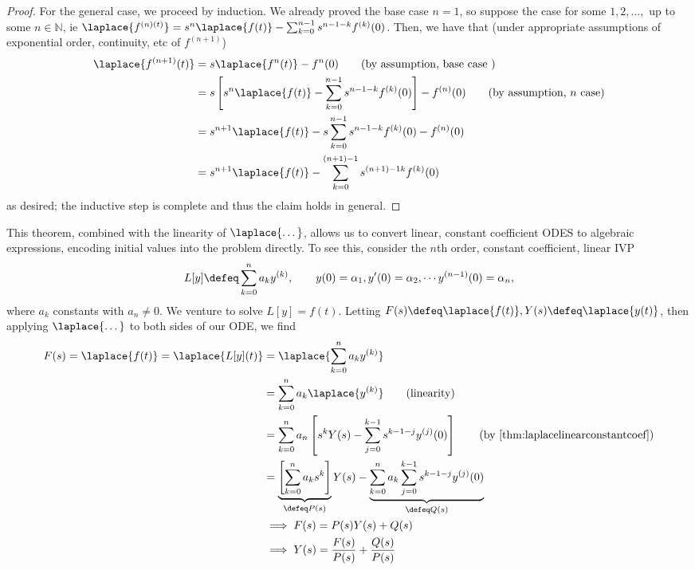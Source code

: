 \begin{proof}
    For the general case, we proceed by induction. We already proved the base case $n = 1$, so suppose the case for some $1, 2, \dots, $ up to some $n \in \mathbb{N}$, ie $\laplace{f^{(n)(t)}} = s^{n} \laplace{f(t)} - \sum_{k=0}^{n-1}s^{n-1-k}f^{(k)}(0)$. Then, we have that (under appropriate assumptions of exponential order, continuity, etc of $f^{(n+1)}$) \begin{align*}
        \laplace{f^{(n+1)}(t)} &= s \laplace{f^{n}(t)} - f^{n}(0) \qquad \text{(by assumption, base case )}\\
        &= s \left[s^n\laplace{f(t)} - \sum_{k=0}^{n-1} s^{n-1-k}f^{(k)}(0)\right] - f^{(n)}(0) \qquad \text{(by assumption, $n$ case)}\\
        &= s^{n+1} \laplace{f(t)} - s \sum_{k=0}^{n-1} s^{n-1 - k} f^{(k)}(0) - f^{(n)}(0)\\
        &= s^{n+1} \laplace{f(t)} - \sum_{k=0}^{(n+1)-1} s^{(n+1)-1  k} f^{(k)}(0)
    \end{align*}
    as desired; the inductive step is complete and thus the claim holds in general.
\end{proof}

This theorem, combined with the linearity of $\laplace{\dots}$, allows us to convert linear, constant coefficient ODES to algebraic expressions, encoding initial values into the problem directly. To see this, consider the $n$th order, constant coefficient, linear IVP \[
L[y] \defeq \sum_{k=0}^n a_ky^{(k)}, \qquad y(0) = \alpha_1, y'(0) = \alpha_2, \cdots y^{(n-1)}(0) = \alpha_n,
\]
where $a_k$ constants with $a_n \neq 0$. We venture to solve $L[y] = f(t)$. Letting $F(s) \defeq \laplace{f(t)}, Y(s) \defeq \laplace{y(t)}$, then applying $\laplace{\dots}$ to both sides of our ODE, we find \begin{align*}
    F(s) = \laplace{f(t)} = \laplace{L[y](t)} &= \laplace{\sum_{k=0}^n a_k y^{(k)}}\\
    &= \sum_{k=0}^n a_k \laplace{y^{(k)}} \qquad \text{(linearity)}\\
    &= \sum_{k=0}^n a_n \left[s^{k}Y(s) - \sum_{j=0}^{k-1} s^{k-1-j} y^{(j)}(0)\right] \qquad \text{(by \cref{thm:laplacelinearconstantcoef})}\\
    &= \underbrace{\left[\sum_{k=0}^n a_k s^k\right]}_{\defeq P(s)} Y(s) -\underbrace{\sum_{k=0}^n a_k \sum_{j=0}^{k-1} s^{k-1-j} y^{(j)}(0)}_{\defeq Q(s)}\\
    &\implies F(s) = P(s) Y(s) + Q(s)\\
    & \implies Y(s) = \frac{F(s)}{P(s)} + \frac{Q(s)}{P(s)}
\end{align*}

